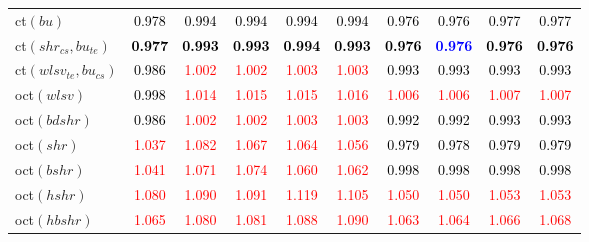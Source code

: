 \begin{tabular}[t]{l|ccccccccc}
ct$(bu)$ & \textcolor{black}{0.978} & \textcolor{black}{0.994} & \textcolor{black}{0.994} & \textcolor{black}{0.994} & \textcolor{black}{0.994} & \textcolor{black}{0.976} & \textcolor{black}{0.976} & \textcolor{black}{0.977} & \textcolor{black}{0.977}\\
ct$(shr_{cs}, bu_{te})$ & \textcolor{black}{\textbf{0.977}} & \textcolor{black}{\textbf{0.993}} & \textcolor{black}{\textbf{0.993}} & \textcolor{black}{\textbf{0.994}} & \textcolor{black}{\textbf{0.993}} & \textcolor{black}{\textbf{0.976}} & \textcolor{blue}{\textbf{0.976}} & \textcolor{black}{\textbf{0.976}} & \textcolor{black}{\textbf{0.976}}\\
ct$(wlsv_{te}, bu_{cs})$ & \textcolor{black}{0.986} & \textcolor{red}{1.002} & \textcolor{red}{1.002} & \textcolor{red}{1.003} & \textcolor{red}{1.003} & \textcolor{black}{0.993} & \textcolor{black}{0.993} & \textcolor{black}{0.993} & \textcolor{black}{0.993}\\
oct$(wlsv)$ & \textcolor{black}{0.998} & \textcolor{red}{1.014} & \textcolor{red}{1.015} & \textcolor{red}{1.015} & \textcolor{red}{1.016} & \textcolor{red}{1.006} & \textcolor{red}{1.006} & \textcolor{red}{1.007} & \textcolor{red}{1.007}\\
oct$(bdshr)$ & \textcolor{black}{0.986} & \textcolor{red}{1.002} & \textcolor{red}{1.002} & \textcolor{red}{1.003} & \textcolor{red}{1.003} & \textcolor{black}{0.992} & \textcolor{black}{0.992} & \textcolor{black}{0.993} & \textcolor{black}{0.993}\\
oct$(shr)$ & \textcolor{red}{1.037} & \textcolor{red}{1.082} & \textcolor{red}{1.067} & \textcolor{red}{1.064} & \textcolor{red}{1.056} & \textcolor{black}{0.979} & \textcolor{black}{0.978} & \textcolor{black}{0.979} & \textcolor{black}{0.979}\\
oct$(bshr)$ & \textcolor{red}{1.041} & \textcolor{red}{1.071} & \textcolor{red}{1.074} & \textcolor{red}{1.060} & \textcolor{red}{1.062} & \textcolor{black}{0.998} & \textcolor{black}{0.998} & \textcolor{black}{0.998} & \textcolor{black}{0.998}\\
oct$(hshr)$ & \textcolor{red}{1.080} & \textcolor{red}{1.090} & \textcolor{red}{1.091} & \textcolor{red}{1.119} & \textcolor{red}{1.105} & \textcolor{red}{1.050} & \textcolor{red}{1.050} & \textcolor{red}{1.053} & \textcolor{red}{1.053}\\
oct$(hbshr)$ & \textcolor{red}{1.065} & \textcolor{red}{1.080} & \textcolor{red}{1.081} & \textcolor{red}{1.088} & \textcolor{red}{1.090} & \textcolor{red}{1.063} & \textcolor{red}{1.064} & \textcolor{red}{1.066} & \textcolor{red}{1.068}\\

\end{tabular}
